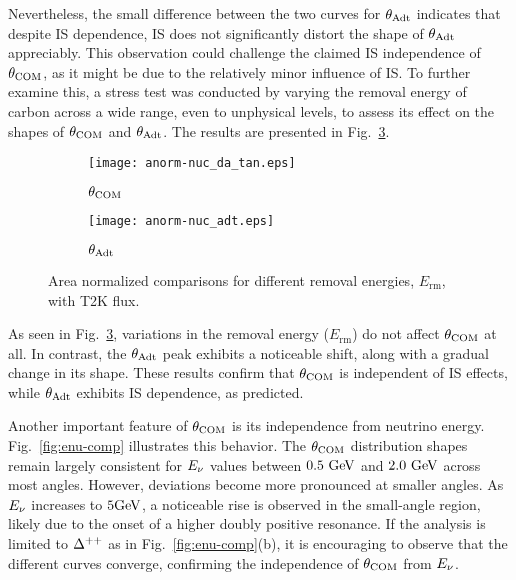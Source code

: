 Nevertheless, the small difference between the two curves for $\theta_{\textrm{Adt}}$ indicates that despite IS dependence, IS does not significantly distort the shape of $\theta_{\textrm{Adt}}$ appreciably.
This observation could challenge the claimed IS independence of $\theta_{\textrm{COM}}$, as it might be due to the relatively minor influence of IS. 
To further examine this, a stress test was conducted by varying the removal energy of carbon across a wide range, even to unphysical levels, to assess its effect on the shapes of $\theta_{\textrm{COM}}$ and $\theta_{\textrm{Adt}}$. 
The results are presented in Fig.~\ref{fig:ermc-comp}.

\begin{figure}[ht!]
    \centering
    \begin{subfigure}[ht!]{\scfigwid\textwidth}
        \centering
        \texttt{[image: anorm-nuc\_da\_tan.eps]}\\
        \caption{$\theta_{\textrm{COM}}$}
        \label{subfig:ermc-comp-com}
    \end{subfigure}
    \begin{subfigure}[ht!]{\scfigwid\textwidth}
        \centering
        \texttt{[image: anorm-nuc\_adt.eps]}
        \caption{$\theta_{\textrm{Adt}}$}
        \label{subfig:ermc-comp-adt}
    \end{subfigure}
        
    \caption{Area normalized comparisons for different removal energies, $E_{\textrm{rm}}$, with T2K flux.}
    \label{fig:ermc-comp}
\end{figure}

As seen in Fig.~\ref{fig:ermc-comp}, variations in the removal energy ($E_{\textrm{rm}}$) do not affect $\theta_{\textrm{COM}}$ at all. 
In contrast, the $\theta_{\textrm{Adt}}$ peak exhibits a noticeable shift, along with a gradual change in its shape.
These results confirm that $\theta_{\textrm{COM}}$ is independent of IS effects, while $\theta_{\textrm{Adt}}$ exhibits IS dependence, as predicted.

Another important feature of $\theta_{\textrm{COM}}$ is its independence from neutrino energy. 
Fig.~\ref{fig:enu-comp} illustrates this behavior. 
The $\theta_{\textrm{COM}}$ distribution shapes remain largely consistent for $E_{\nu}$ values between $0.5~\textrm{GeV}$ and $2.0~\textrm{GeV}$ across most angles.
However, deviations become more pronounced at smaller angles. 
As $E_{\nu}$ increases to $5\textrm{GeV}$, a noticeable rise is observed in the small-angle region, likely due to the onset of a higher doubly positive resonance. 
If the analysis is limited to $\Delta^{++}$ as in Fig.~\ref{fig:enu-comp}(b), it is encouraging to observe that the different curves converge, confirming the independence of $\theta_{\textrm{COM}}$ from $E_{\nu}$.

